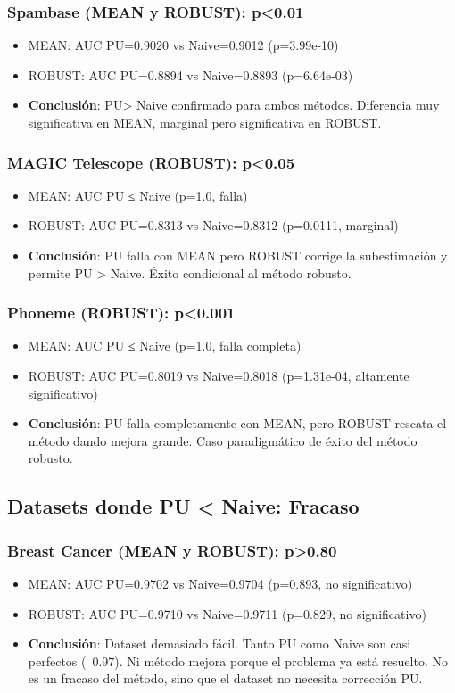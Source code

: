 \documentclass[a4paper,11pt]{article}
\begin{document}
\subsubsection{Spambase (MEAN y ROBUST): p<0.01}
\begin{itemize}
    \item MEAN: AUC PU=0.9020 vs Naive=0.9012 (p=3.99e-10)
    \item ROBUST: AUC PU=0.8894 vs Naive=0.8893 (p=6.64e-03)
    \item \textbf{Conclusión}: PU> Naive confirmado para ambos métodos. Diferencia muy significativa en MEAN, marginal pero significativa en ROBUST.
\end{itemize}

\subsubsection{MAGIC Telescope (ROBUST): p<0.05}
\begin{itemize}
    \item MEAN: AUC PU ≤ Naive (p=1.0, falla)
    \item ROBUST: AUC PU=0.8313 vs Naive=0.8312 (p=0.0111, marginal)
    \item \textbf{Conclusión}: PU falla con MEAN pero ROBUST corrige la subestimación y permite PU > Naive. Éxito condicional al método robusto.
\end{itemize}

\subsubsection{Phoneme (ROBUST): p<0.001}
\begin{itemize}
    \item MEAN: AUC PU ≤ Naive (p=1.0, falla completa)
    \item ROBUST: AUC PU=0.8019 vs Naive=0.8018 (p=1.31e-04, altamente significativo)
    \item \textbf{Conclusión}: PU falla completamente con MEAN, pero ROBUST rescata el método dando mejora grande. Caso paradigmático de éxito del método robusto.
\end{itemize}

\subsection{Datasets donde PU < Naive: Fracaso}

\subsubsection{Breast Cancer (MEAN y ROBUST): p>0.80}
\begin{itemize}
    \item MEAN: AUC PU=0.9702 vs Naive=0.9704 (p=0.893, no significativo)
    \item ROBUST: AUC PU=0.9710 vs Naive=0.9711 (p=0.829, no significativo)
    \item \textbf{Conclusión}: Dataset demasiado fácil. Tanto PU como Naive son casi perfectos (~0.97). Ni método mejora porque el problema ya está resuelto. No es un fracaso del método, sino que el dataset no necesita corrección PU.
\end{itemize}
\end{document}
